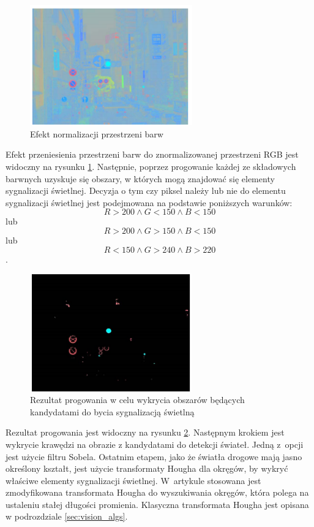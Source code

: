 \begin{figure}
  \centering
  \includegraphics[width=7cm]{img/tl_norm.png}
  \caption{Efekt normalizacji przestrzeni barw\cite{T4}}
  \label{fig:tl_norm}
\end{figure}

Efekt przeniesienia przestrzeni barw do znormalizowanej przestrzeni RGB jest widoczny na rysunku \ref{fig:tl_norm}.
Następnie, poprzez progowanie każdej ze składowych barwnych uzyskuje się obszary, w których mogą znajdować się elementy sygnalizacji świetlnej. 
Decyzja o tym czy piksel należy lub nie do elementu sygnalizacji świetlnej jest podejmowana na podstawie poniższych warunków:
\begin{equation}
R>200 \wedge G< 150 \wedge B<150
\end{equation}
lub
\begin{equation}
R>200 \wedge G> 150 \wedge B<150
\end{equation} 
lub
\begin{equation}
R<150 \wedge G>240 \wedge B>220
\end{equation}.

\begin{figure}
  \centering
  \includegraphics[width=7cm]{img/tl_thresh.png}
  \caption{Rezultat progowania w celu wykrycia obszarów będących kandydatami do bycia sygnalizacją świetlną\cite{T4}}
  \label{fig:tl_thresh}
\end{figure}

Rezultat progowania jest widoczny na rysunku \ref{fig:tl_thresh}. 
Następnym krokiem jest wykrycie krawędzi na obrazie z kandydatami do detekcji świateł. 
Jedną z~opcji jest użycie filtru Sobela. 
Ostatnim etapem, jako że światła drogowe mają jasno określony kształt, jest użycie transformaty Hougha dla okręgów, by wykryć właściwe elementy sygnalizacji świetlnej. 
W~artykule stosowana jest zmodyfikowana transformata Hougha do wyszukiwania okręgów, która polega na ustaleniu stałej długości promienia. 
Klasyczna transformata Hougha jest opisana w podrozdziale \ref{sec:vision_algs}.

